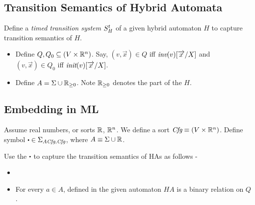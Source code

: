 \documentclass[]{article}
\begin{document}
\subsection{Transition Semantics of Hybrid Automata}
Define a \textit{timed transition system} $S^t_H$ of a given hybrid automaton
$H$ to capture transition semantics of $H$.
\begin{itemize}
  \item Define $Q, Q_0 \subseteq (V \times \mathbb{R}^{n})$. Say, $(v, \vec{x}) \in Q$ iff
    $\textit{inv}(v)[\overrightarrow{x} / X]$ and $(v, \vec{x}) \in Q_0$ iff $\textit{init}(v)[\overrightarrow{x} /
    X]$.
  \item Define $A = \Sigma \cup \mathbb{R}_{\geq 0} $. Note $\mathbb{R}_{\geq 0}$ denotes the 
    part of the $H$.
\end{itemize}



\subsection{Embedding in ML}
Assume real numbers, or sorts $\mathbb{R}$, $\mathbb{R}^{n}$. We define a sort $\textit{Cfg} \equiv (V
\times \mathbb{R}^{n})$. Define symbol $\sbullet \in \Sigma_{A \Cfg, \Cfg}$, where $A
\equiv \Sigma \cup \mathbb{R}$.

Use the $\sbullet$ to capture the transition semantics of HAs as follows -
\begin{itemize}
  \item
  \item For every $a \in A$, defined in the given automaton $HA$ is a binary
    relation on $Q$.
\end{itemize}
\end{document}
